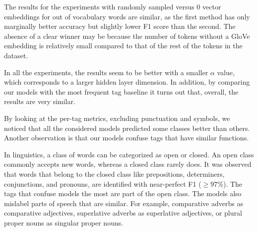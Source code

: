 \documentclass[11pt]{article}
\begin{document}
The results for the experiments with randomly sampled versus $0$ vector embeddings for out of vocabulary words are similar, as the first method has only marginally better accuracy but slightly lower F1 score than the second. The absence of a clear winner may be because the number of tokens without a GloVe embedding is relatively small compared to that of the rest of the tokens in the dataset.

In all the experiments, the results seem to be better with a smaller $\alpha$ value, which corresponds to a larger hidden layer dimension. In addition, by comparing our models with the most frequent tag baseline it turns out that, overall, the results are very similar. %


By looking at the per-tag metrics, excluding punctuation and symbols, we noticed that all the considered models predicted some classes better than others. Another observation is that our models confuse tags that have similar functions.

In linguistics, a class of words can be categorized as open or closed. An open class commonly accepts new words, whereas a closed class rarely does.
It was observed that words that belong to the closed class like prepositions, determiners, conjunctions, and pronouns, are identified with near-perfect F1 ($\geq 97\%$).
The tags that confuse models the most are part of the open class. The models also mislabel parts of speech that are similar. For example, comparative adverbs as comparative adjectives, superlative adverbs as superlative adjectives, or plural proper nouns as singular proper nouns.
\end{document}
